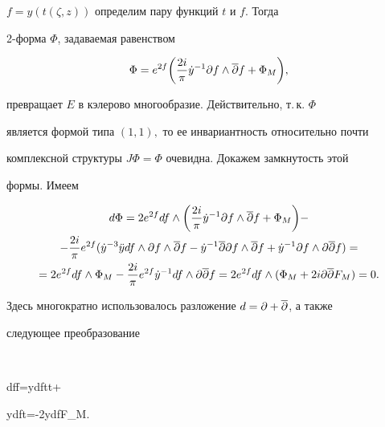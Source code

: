 $f=y(t(\zeta,z))$ определим пару функций $t$ и $f$. Тогда


2-форма $\Phi$, задаваемая равенством


\begin{equation}


\Phi =e^{2f}\bigg(\frac{2i}{\pi}\Dot y^{-1}\partial


f\land \Olpat f+\Phi_M\bigg),


\label{1.1}


\end{equation}


превращает $E$ в кэлерово многообразие. Действительно, т.\,к. $\Phi $


является формой типа $(1,1),$ то ее инвариантность относительно почти


комплексной структуры $J\Phi =\Phi$ очевидна. Докажем замкнутость этой


формы. Имеем


\begin{multline*}


d\Phi =2e^{2f}df\land


\bigg(\frac{2i}{\pi }\Dot y^{-1}\partial f\land \overline{\partial }f+


\Phi_M\bigg)-\\


%


-\frac{2i}{\pi }e^{2f}( \Dot y^{-3}\Ddot ydf\land \partial f\land \Olpat f-


\Dot y^{-1}\Olpat \partial f\land \Olpat f+


\Dot y^{-1}\partial f\land \partial \Olpat f) =\\


%


=


2e^{2f}df\land \Phi_M-\frac{2i}{\pi }e^{2f}\Dot y^{-1}df\land


\partial \Olpat f=


2e^{2f}df\land ( \Phi_M+2i\partial \Olpat F_M) =0.


\end{multline*}


Здесь многократно использовалось разложение $d=\partial +\overline{\partial }$, а также


следующее преобразование


$$


df\land \partial \Olpat f=\Ddot ydf\land \partial t\land \Olpat t+


\Dot ydf\land \partial \Olpat t=-2\pi \Dot ydf\land \partial \Olpat F_M.


